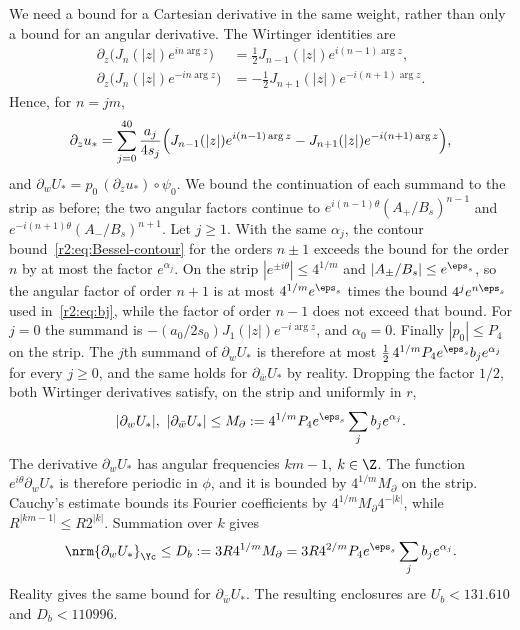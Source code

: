 We need a bound for a Cartesian derivative in the same weight, rather than only a bound for an angular derivative. The Wirtinger identities are
\begin{align*}
 \partial_z\bigl(J_n(|z|)e^{in\arg z}\bigr)
 &=\tfrac12J_{n-1}(|z|)e^{i(n-1)\arg z},\\
 \partial_z\bigl(J_n(|z|)e^{-in\arg z}\bigr)
 &=-\tfrac12J_{n+1}(|z|)e^{-i(n+1)\arg z}.
\end{align*}
Hence, for $n=jm$,
\[
 \partial_zu_*=\sum_{j=0}^{40}\frac{a_j}{4s_j}
 \Bigl(J_{n-1}(|z|)e^{i(n-1)\arg z}-J_{n+1}(|z|)e^{-i(n+1)\arg z}\Bigr),
\]
and $\partial_wU_*=p_0\,(\partial_zu_*)\circ\psi_0$. We bound the continuation of each summand to the strip as before; the two angular factors continue to $e^{i(n-1)\theta}(A_+/B_s)^{n-1}$ and $e^{-i(n+1)\theta}(A_-/B_s)^{n+1}$. Let $j\ge1$. With the same $\alpha_j$, the contour bound~\eqref{r2:eq:Bessel-contour} for the orders $n\pm1$ exceeds the bound for the order $n$ by at most the factor $e^{\alpha_j}$. On the strip $|e^{\pm i\theta}|\le4^{1/m}$ and $|A_\pm/B_s|\le e^{\eps_s}$, so the angular factor of order $n+1$ is at most $4^{1/m}e^{\eps_s}$ times the bound $4^je^{n\eps_s}$ used in~\eqref{r2:eq:bj}, while the factor of order $n-1$ does not exceed that bound. For $j=0$ the summand is $-(a_0/2s_0)J_1(|z|)e^{-i\arg z}$, and $\alpha_0=0$. Finally $|p_0|\le P_4$ on the strip. The $j$th summand of $\partial_wU_*$ is therefore at most $\frac12\,4^{1/m}P_4e^{\eps_s}b_je^{\alpha_j}$ for every $j\ge0$, and the same holds for $\partial_{\bar w}U_*$ by reality. Dropping the factor $1/2$, both Wirtinger derivatives satisfy, on the strip and uniformly in $r$,
\begin{equation}\label{r2:eq:strip-derivative}
 |\partial_wU_*|,\ |\partial_{\bar w}U_*|\le
 M_\partial:=4^{1/m}P_4e^{\eps_s}\sum_jb_je^{\alpha_j}.
\end{equation}
The derivative $\partial_wU_*$ has angular frequencies $km-1$, $k\in\Z$. The function $e^{i\theta}\partial_wU_*$ is therefore periodic in $\phi$, and it is bounded by $4^{1/m}M_\partial$ on the strip. Cauchy's estimate bounds its Fourier coefficients by $4^{1/m}M_\partial4^{-|k|}$, while $R^{|km-1|}\le R2^{|k|}$. Summation over $k$ gives
\begin{equation}\label{r2:eq:Db}
 \nrm{\partial_wU_*}_{\Yc}\le
 D_b:=3R4^{1/m}M_\partial=3R4^{2/m}P_4e^{\eps_s}\sum_jb_je^{\alpha_j}.
\end{equation}
Reality gives the same bound for $\partial_{\bar w}U_*$. The resulting enclosures are $U_b<131.610$ and $D_b<110996$.

